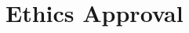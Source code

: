 \documentclass{monashthesis}
\begin{document}
\hypertarget{ch:ethics}{%
\chapter{Ethics Approval}\label{ch:ethics}}



\printbibliography[heading=bibintoc]
\end{document}
